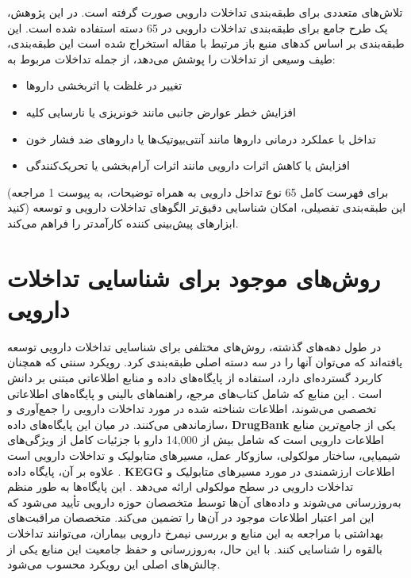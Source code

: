تلاش‌های متعددی برای طبقه‌بندی تداخلات دارویی صورت گرفته است. در این پژوهش، یک طرح جامع برای طبقه‌بندی تداخلات دارویی در 65 دسته استفاده شده است. این طبقه‌بندی بر اساس کدهای منبع باز مرتبط با مقاله \cite{ref_ryu2018} استخراج شده است این طبقه‌بندی، طیف وسیعی از تداخلات را پوشش می‌دهد، از جمله تداخلات مربوط به:

\begin{itemize}
	\item تغییر در غلظت یا اثربخشی داروها
	\item افزایش خطر عوارض جانبی مانند خونریزی یا نارسایی کلیه
	\item تداخل با عملکرد درمانی داروها مانند آنتی‌بیوتیک‌ها یا داروهای ضد فشار خون
	\item افزایش یا کاهش اثرات دارویی مانند اثرات آرام‌بخشی یا تحریک‌کنندگی
\end{itemize}

(برای فهرست کامل 65 نوع تداخل دارویی به همراه توضیحات، به پیوست 1 مراجعه کنید)
این طبقه‌بندی تفصیلی، امکان شناسایی دقیق‌تر الگوهای تداخلات دارویی و توسعه ابزارهای پیش‌بینی کننده کارآمدتر را فراهم می‌کند.

\section{روش‌های موجود برای شناسایی تداخلات دارویی}

در طول دهه‌های گذشته، روش‌های مختلفی برای شناسایی تداخلات دارویی توسعه یافته‌اند که می‌توان آنها را در سه دسته اصلی طبقه‌بندی کرد. رویکرد سنتی که همچنان کاربرد گسترده‌ای دارد، استفاده از پایگاه‌های داده و منابع اطلاعاتی مبتنی بر دانش است \cite{ref_ryu2018}. این منابع که شامل کتاب‌های مرجع، راهنماهای بالینی و پایگاه‌های اطلاعاتی تخصصی می‌شوند، اطلاعات شناخته شده در مورد تداخلات دارویی را جمع‌آوری و سازماندهی می‌کنند. در میان این پایگاه‌های داده، \textbf{DrugBank} یکی از جامع‌ترین منابع اطلاعات دارویی است که شامل بیش از 14,000 دارو با جزئیات کامل از ویژگی‌های شیمیایی، ساختار مولکولی، سازوکار عمل، مسیرهای متابولیک و تداخلات دارویی است \cite{ref_drugbank}. علاوه بر آن، پایگاه داده \textbf{KEGG} اطلاعات ارزشمندی در مورد مسیرهای متابولیک و تداخلات دارویی در سطح مولکولی ارائه می‌دهد \cite{ref_kegg}. این پایگاه‌ها به طور منظم به‌روزرسانی می‌شوند و داده‌های آن‌ها توسط متخصصان حوزه دارویی تأیید می‌شود که این امر اعتبار اطلاعات موجود در آن‌ها را تضمین می‌کند. متخصصان مراقبت‌های بهداشتی با مراجعه به این منابع و بررسی نیمرخ دارویی بیماران، می‌توانند تداخلات بالقوه را شناسایی کنند. با این حال، به‌روزرسانی و حفظ جامعیت این منابع یکی از چالش‌های اصلی این رویکرد محسوب می‌شود.

